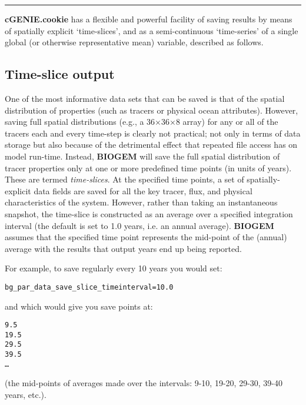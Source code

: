 \vspace{1mm}\noindent\rule{4cm}{0.5pt}\vspace{2mm}

\noindent \textbf{cGENIE.cookie} has a flexible and powerful facility of saving results by means of spatially explicit ‘time-slices’, and as a semi-continuous ‘time-series’ of a single global (or otherwise representative mean) variable, described as follows.


\subsection{Time-slice output}

One of the most informative data sets that can be saved is that of the spatial distribution of properties (such as tracers or physical ocean attributes). However, saving full spatial distributions (e.g., a 36\(\times\)36\(\times\)8 array) for any or all of the tracers each and every time-step is clearly not practical; not only in terms of data storage but also because of the detrimental effect that repeated file access has on model run-time.
Instead, \textbf{BIOGEM} will save the full spatial distribution of tracer properties only at one or more predefined time points (in units of years). These are termed \textit{time-slices}. At the specified time points, a set of spatially-explicit data fields are saved for all the key tracer, flux, and physical characteristics of the system. However, rather than taking an instantaneous snapshot, the time-slice is constructed as an average over a specified integration interval (the default is set to 1.0 years, i.e. an annual average). \textbf{BIOGEM}  assumes that the specified time point represents the mid-point of the (annual) average with the results that output years end up being reported.

\vspace{1mm}
For example, to save regularly every 10 years you would set:

\vspace{-1mm}
\small\begin{verbatim}
bg_par_data_save_slice_timeinterval=10.0
\end{verbatim}\normalsize
\vspace{-1mm}
and which would give you save points at:

\vspace{-1mm}\footnotesize\begin{verbatim}
9.5
19.5
29.5
39.5
…
\end{verbatim}\normalsize\vspace{-1mm}
(the mid-points of averages made over the intervals: 9-10, 19-20, 29-30, 39-40 years, etc.).

